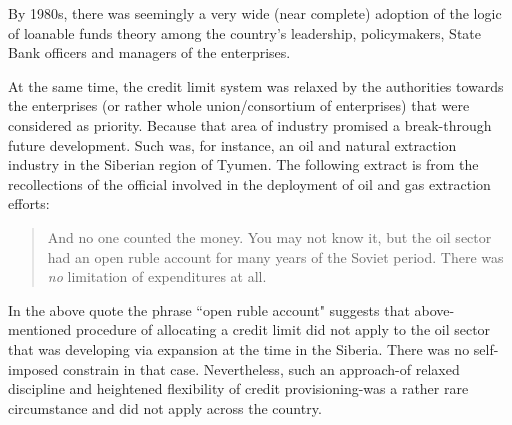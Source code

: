 By 1980s, there was seemingly a very wide (near complete) adoption of the logic of loanable funds theory among the country's leadership, policymakers, State Bank officers and managers of the enterprises.

At the same time, the credit limit system was relaxed by the authorities towards the enterprises (or rather whole union/consortium of enterprises) that were considered as priority. Because that area of industry promised a break-through future development. Such was, for instance, an oil and natural extraction industry in the Siberian region of Tyumen. The following extract is from the recollections of the official involved in the deployment of oil and gas extraction efforts:

\begin{quote}
And no one counted the money. You may not know it, but the oil sector had an open ruble account for many years of the Soviet period. There was \textit{no} limitation of expenditures at all.~\citep[p.~226, emphasis added]{aven2015}
\end{quote}

In the above quote the phrase ``open ruble account" suggests that above-mentioned procedure of allocating a credit limit did not apply to the oil sector that was developing via expansion at the time in the Siberia. There was no self-imposed constrain in that case. Nevertheless, such an approach-of relaxed discipline and heightened flexibility of credit provisioning-was a rather rare circumstance and did not apply across the country. 

